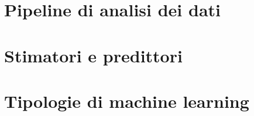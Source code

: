 \documentclass[italian, twoside]{../../../Resources/Utils/ClassNotes}
\begin{document}

\section{Pipeline di analisi dei dati}


\section{Stimatori e predittori}


\section{Tipologie di machine learning}


% 

% 

% 
\end{document}
